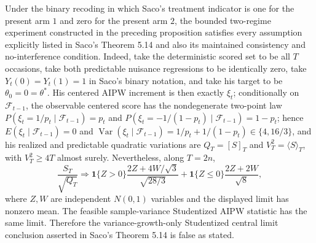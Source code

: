 Under the binary recoding in which Saco's treatment indicator is one for the present arm \(1\) and zero for the present arm \(2\), the bounded two-regime experiment constructed in the preceding proposition satisfies every assumption explicitly listed in Saco's Theorem 5.14 and also its maintained consistency and no-interference condition. Indeed, take the deterministic scored set to be all \(T\) occasions, take both predictable nuisance regressions to be identically zero, take \(Y_t(0)=Y_t(1)=1\) in Saco's binary notation, and take his target to be \(\theta_0=0=\theta^*\). His centered AIPW increment is then exactly \(\xi_t\); conditionally on \(\mathcal F_{t-1}\), the observable centered score has the nondegenerate two-point law \(P(\xi_t=1/p_t\mid\mathcal F_{t-1})=p_t\) and \(P(\xi_t=-1/(1-p_t)\mid\mathcal F_{t-1})=1-p_t\); hence \(E(\xi_t\mid\mathcal F_{t-1})=0\) and \(\operatorname{Var}(\xi_t\mid\mathcal F_{t-1})=1/p_t+1/(1-p_t)\in\{4,16/3\}\), and his realized and predictable quadratic variations are \(Q_T=[S]_T\) and \(V_T^2=\langle S\rangle_T\), with \(V_T^2\ge 4T\) almost surely. Nevertheless, along \(T=2n\),
\[
 \frac{S_T}{\sqrt{Q_T}}\Longrightarrow
 \mathbf1\{Z>0\}\frac{2Z+4W/\sqrt3}{\sqrt{28/3}}
 +\mathbf1\{Z\le0\}\frac{2Z+2W}{\sqrt8},
\]
where \(Z,W\) are independent \(N(0,1)\) variables and the displayed limit has nonzero mean. The feasible sample-variance Studentized AIPW statistic has the same limit. Therefore the variance-growth-only Studentized central limit conclusion asserted in Saco's Theorem 5.14 is false as stated.